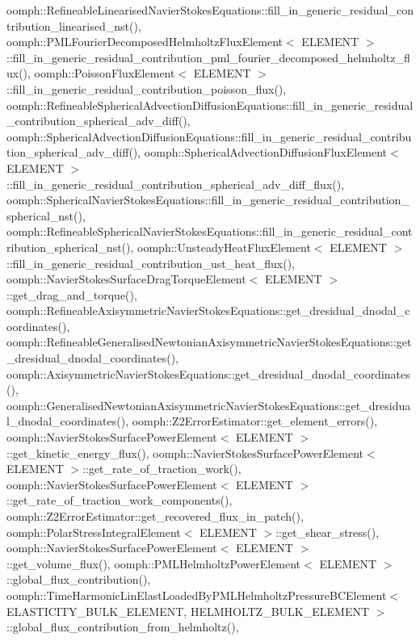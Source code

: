 oomph\+::\+Refineable\+Linearised\+Navier\+Stokes\+Equations\+::fill\+\_\+in\+\_\+generic\+\_\+residual\+\_\+contribution\+\_\+linearised\+\_\+nst(), oomph\+::\+P\+M\+L\+Fourier\+Decomposed\+Helmholtz\+Flux\+Element$<$ E\+L\+E\+M\+E\+N\+T $>$\+::fill\+\_\+in\+\_\+generic\+\_\+residual\+\_\+contribution\+\_\+pml\+\_\+fourier\+\_\+decomposed\+\_\+helmholtz\+\_\+flux(), oomph\+::\+Poisson\+Flux\+Element$<$ E\+L\+E\+M\+E\+N\+T $>$\+::fill\+\_\+in\+\_\+generic\+\_\+residual\+\_\+contribution\+\_\+poisson\+\_\+flux(), oomph\+::\+Refineable\+Spherical\+Advection\+Diffusion\+Equations\+::fill\+\_\+in\+\_\+generic\+\_\+residual\+\_\+contribution\+\_\+spherical\+\_\+adv\+\_\+diff(), oomph\+::\+Spherical\+Advection\+Diffusion\+Equations\+::fill\+\_\+in\+\_\+generic\+\_\+residual\+\_\+contribution\+\_\+spherical\+\_\+adv\+\_\+diff(), oomph\+::\+Spherical\+Advection\+Diffusion\+Flux\+Element$<$ E\+L\+E\+M\+E\+N\+T $>$\+::fill\+\_\+in\+\_\+generic\+\_\+residual\+\_\+contribution\+\_\+spherical\+\_\+adv\+\_\+diff\+\_\+flux(), oomph\+::\+Spherical\+Navier\+Stokes\+Equations\+::fill\+\_\+in\+\_\+generic\+\_\+residual\+\_\+contribution\+\_\+spherical\+\_\+nst(), oomph\+::\+Refineable\+Spherical\+Navier\+Stokes\+Equations\+::fill\+\_\+in\+\_\+generic\+\_\+residual\+\_\+contribution\+\_\+spherical\+\_\+nst(), oomph\+::\+Unsteady\+Heat\+Flux\+Element$<$ E\+L\+E\+M\+E\+N\+T $>$\+::fill\+\_\+in\+\_\+generic\+\_\+residual\+\_\+contribution\+\_\+ust\+\_\+heat\+\_\+flux(), oomph\+::\+Navier\+Stokes\+Surface\+Drag\+Torque\+Element$<$ E\+L\+E\+M\+E\+N\+T $>$\+::get\+\_\+drag\+\_\+and\+\_\+torque(), oomph\+::\+Refineable\+Axisymmetric\+Navier\+Stokes\+Equations\+::get\+\_\+dresidual\+\_\+dnodal\+\_\+coordinates(), oomph\+::\+Refineable\+Generalised\+Newtonian\+Axisymmetric\+Navier\+Stokes\+Equations\+::get\+\_\+dresidual\+\_\+dnodal\+\_\+coordinates(), oomph\+::\+Axisymmetric\+Navier\+Stokes\+Equations\+::get\+\_\+dresidual\+\_\+dnodal\+\_\+coordinates(), oomph\+::\+Generalised\+Newtonian\+Axisymmetric\+Navier\+Stokes\+Equations\+::get\+\_\+dresidual\+\_\+dnodal\+\_\+coordinates(), oomph\+::\+Z2\+Error\+Estimator\+::get\+\_\+element\+\_\+errors(), oomph\+::\+Navier\+Stokes\+Surface\+Power\+Element$<$ E\+L\+E\+M\+E\+N\+T $>$\+::get\+\_\+kinetic\+\_\+energy\+\_\+flux(), oomph\+::\+Navier\+Stokes\+Surface\+Power\+Element$<$ E\+L\+E\+M\+E\+N\+T $>$\+::get\+\_\+rate\+\_\+of\+\_\+traction\+\_\+work(), oomph\+::\+Navier\+Stokes\+Surface\+Power\+Element$<$ E\+L\+E\+M\+E\+N\+T $>$\+::get\+\_\+rate\+\_\+of\+\_\+traction\+\_\+work\+\_\+components(), oomph\+::\+Z2\+Error\+Estimator\+::get\+\_\+recovered\+\_\+flux\+\_\+in\+\_\+patch(), oomph\+::\+Polar\+Stress\+Integral\+Element$<$ E\+L\+E\+M\+E\+N\+T $>$\+::get\+\_\+shear\+\_\+stress(), oomph\+::\+Navier\+Stokes\+Surface\+Power\+Element$<$ E\+L\+E\+M\+E\+N\+T $>$\+::get\+\_\+volume\+\_\+flux(), oomph\+::\+P\+M\+L\+Helmholtz\+Power\+Element$<$ E\+L\+E\+M\+E\+N\+T $>$\+::global\+\_\+flux\+\_\+contribution(), oomph\+::\+Time\+Harmonic\+Lin\+Elast\+Loaded\+By\+P\+M\+L\+Helmholtz\+Pressure\+B\+C\+Element$<$ E\+L\+A\+S\+T\+I\+C\+I\+T\+Y\+\_\+\+B\+U\+L\+K\+\_\+\+E\+L\+E\+M\+E\+N\+T, H\+E\+L\+M\+H\+O\+L\+T\+Z\+\_\+\+B\+U\+L\+K\+\_\+\+E\+L\+E\+M\+E\+N\+T $>$\+::global\+\_\+flux\+\_\+contribution\+\_\+from\+\_\+helmholtz(), 